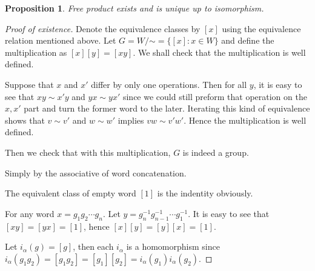 \documentclass[a4paper]{article}
\theoremstyle{remark}
\theoremstyle{definition}
\theoremstyle{definition}
\theoremstyle{plain}
\newtheorem{proposition}{Proposition}
\begin{document}
  \begin{proposition}
    Free product exists and is unique up to isomorphism.
  \end{proposition}

  \begin{proof}[Proof of existence]
    Denote the equivalence classes by $[x]$ using the equivalence relation mentioned above.
    Let $G = W\!/\mathord\sim = \big\{ [x] : x \in W \big\}$ and define the multiplication as 
    $[x][y] = [xy]$. We shall check that the multiplication is well defined.

    Suppose that $x$ and $x'$ differ by only one operations. Then for all $y$, it is easy to 
    see that $xy \sim x'y$ and $yx \sim yx'$ since we could still preform that 
    operation on the $x, x'$ part and turn the former word to the later. Iterating this
    kind of equivalence shows that $v \sim v'$ and $w \sim w'$ implies $vw \sim v'w'$. Hence 
    the multiplication is well defined.

    Then we check that with this multiplication, $G$ is indeed a group.
    \begin{description}[style=standard]
      \item[associative:] Simply by the associative of word concatenation.
      \item[indentity:] The equivalent class of empty word $[1]$ is the indentity obviously.
      \item[inverse:] For any word $x = g_1 g_2 \cdots g_n$. Let $y = g^{-1}_n g^{-1}_{n-1} \cdots g^{-1}_1$.
        It is easy to see that $[xy] = [yx] = [1]$, hence $[x][y] = [y][x] = [1]$.
    \end{description}
    Let $i_\alpha(g) = [g]$, then each $i_\alpha$ is a homomorphism since $i_\alpha(g_1 g_2) = [g_1 g_2]
    = [g_1] [g_2] = i_\alpha(g_1) i_\alpha(g_2)$.


\end{proof}
\end{document}
